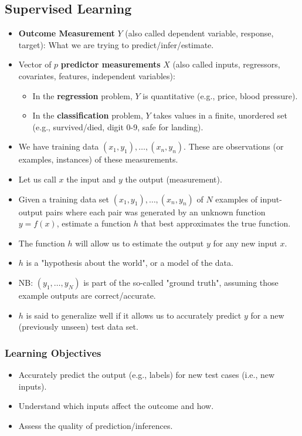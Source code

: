 \documentclass[8pt]{article}
\begin{document}
\subsection*{Supervised Learning}
\begin{itemize}
    \item \textbf{Outcome Measurement} \( Y \) (also called dependent variable, response, target): What we are trying to predict/infer/estimate.
    \item Vector of \( p \) \textbf{predictor measurements} \( X \) (also called inputs, regressors, covariates, features, independent variables):
    \begin{itemize}
        \item In the \textbf{regression} problem, \( Y \) is quantitative (e.g., price, blood pressure).
        \item In the \textbf{classification} problem, \( Y \) takes values in a finite, unordered set (e.g., survived/died, digit 0-9, safe for landing).
    \end{itemize}
    \item We have training data \( (x_1, y_1), \ldots, (x_n, y_n) \). These are observations (or examples, instances) of these measurements.
    \item Let us call \( x \) the input and \( y \) the output (measurement).
    \item Given a training data set \( (x_1, y_1), \ldots, (x_n, y_n) \) of \( N \) examples of input-output pairs where each pair was generated by an unknown function \( y = f(x) \), estimate a function \( h \) that best approximates the true function.
    \item The function \( h \) will allow us to estimate the output \( y \) for any new input \( x \).
    \item \( h \) is a "hypothesis about the world", or a model of the data.
    \item NB: \( (y_1, \ldots, y_N) \) is part of the so-called "ground truth", assuming those example outputs are correct/accurate.
    \item \( h \) is said to generalize well if it allows us to accurately predict \( y \) for a new (previously unseen) test data set.
\end{itemize}

\subsubsection*{Learning Objectives}
\begin{itemize}
    \item Accurately predict the output (e.g., labels) for new test cases (i.e., new inputs).
    \item Understand which inputs affect the outcome and how.
    \item Assess the quality of prediction/inferences.
\end{itemize}
\end{document}
